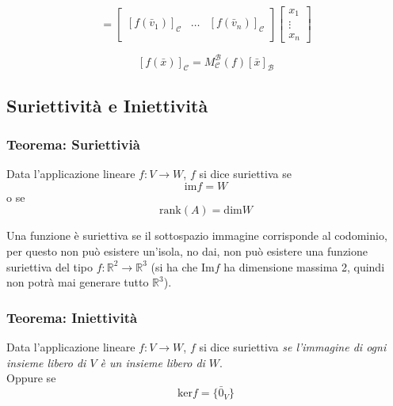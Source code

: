 \documentclass[x11names]{article}
\begin{document}
\[
= \left[\begin{array}{c|c|c}
	& & \\
	\left[f(\bar{v}_{1})\right]_{\mathcal{C}} & \dots & \left[f(\bar{v}_{n})\right]_{\mathcal{C}}\\
	& &
\end{array}\right]\left[\begin{array}{c}
x_{1} \\ \vdots \\ x_{n}
\end{array}\right]
\]

\[
\left[f(\bar{x})\right]_{\mathcal{C}} = M^\mathcal{B}_{\mathcal{C}}(f)\left[\bar{x}\right]_{\mathcal{B}}
\]


\subsection{Suriettività e Iniettività}
\begin{center}
	\colorbox{myred}{\begin{minipage}{5.75in}
			\begin{redes}{}
	\subsubsection{Teorema: Suriettivià}
Data l'applicazione lineare $f: V \to W$, $f$ si dice suriettiva se 
\[
\text{im}f = W
\]
o se 
\[
\text{rank}(A) = \text{dim}W
\]
	\end{redes}
	\end{minipage}}        
\end{center}
			

\noindent
Una funzione è suriettiva se il sottospazio immagine corrisponde al codominio, per questo non può esistere un'isola, no dai, non può esistere una funzione suriettiva del tipo $f:\mathbb{R}^2 \to \mathbb{R}^3$ (si ha che $\text{Im}f$ ha dimensione massima 2, quindi non potrà mai generare tutto $\mathbb{R}^3$).


\begin{center}
	\colorbox{myred}{\begin{minipage}{5.75in}
			\begin{redes}{}
			\subsubsection{Teorema: Iniettività}
			Data l'applicazione lineare $f: V \to W$, $f$ si dice suriettiva \textit{se l'immagine di ogni insieme libero di $V$ è un insieme libero di $W$}. \\
			
			Oppure se 
			\[
			\text{ker}f = \{\bar{0}_{V}\}
			\]
				
				
			\end{redes}
	\end{minipage}}        
\end{center}
				
\end{document}
